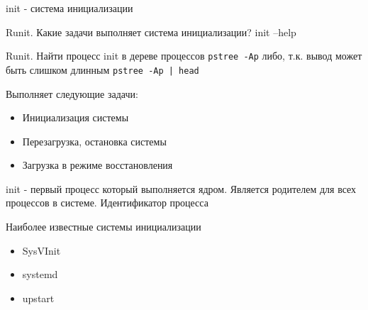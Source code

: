 \begin{frame}{init - система инициализации}


\begin{block}{Runit. Какие задачи выполняет система инициализации?}
init --help
\end{block}

\begin{block}{Runit. Найти процесс init в дереве процессов}
{\tt pstree -Ap}
либо, т.к. вывод может быть слишком длинным
{\tt pstree -Ap | head}
\end{block}

\pause
 Выполняет следующие задачи:
\begin{itemize}
    \item Инициализация системы
    \item Перезагрузка, остановка системы
    \item Загрузка в режиме восстановления 
\end{itemize}

        \pause
\alert{init} - первый процесс который выполняется ядром.
        Является родителем для всех процессов в системе.
	\bigskip
        Идентификатор процесса

	\bigskip

	\begin{block}{Наиболее известные системы инициализации}
		\begin{itemize}
			\item SysVInit
			\item systemd
			\item upstart
		\end{itemize}
	\end{block}
\end{frame}


